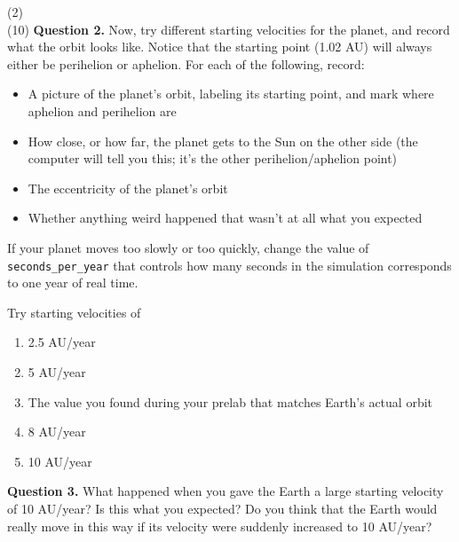 \documentclass[11pt]{article}
\begin{document}
\vspace{1.5cm}
(2) \hrulefill\\


(10) \textbf{Question 2.} Now, try different starting velocities for the planet, and record what the orbit looks like. Notice that the starting point (1.02 AU) will always either be perihelion or aphelion. For each of the following, record:

\begin{itemize}

\item A picture of the planet's orbit, labeling its starting point, and mark where aphelion and perihelion are

\item How close, or how far, the planet gets to the Sun on the other side (the computer will tell you this; it's the other perihelion/aphelion point)

\item The eccentricity of the planet's orbit

\item Whether anything weird happened that wasn't at all what you expected

\end{itemize}


If your planet moves too slowly or too quickly, change the value of {\tt seconds\_per\_year} that controls how many seconds in the simulation corresponds to one year of real time.


\newpage
Try starting velocities of


\begin{enumerate}
	\item 2.5 AU/year
	\vspace{1.5in}
	\item 5 AU/year
	\vspace{1.5in}
	\item The value you found during your prelab that matches Earth's actual orbit
	\vspace{1.5in}
	\item 8 AU/year
	\vspace{1.5in}
	\item 10 AU/year
	
\end{enumerate}

\newpage

\textbf{Question 3.} What happened when you gave the Earth a large starting velocity of 10 AU/year? Is this what you expected? Do you think that the Earth would really move in this way if its velocity were suddenly increased to 10 AU/year?
\end{document}
